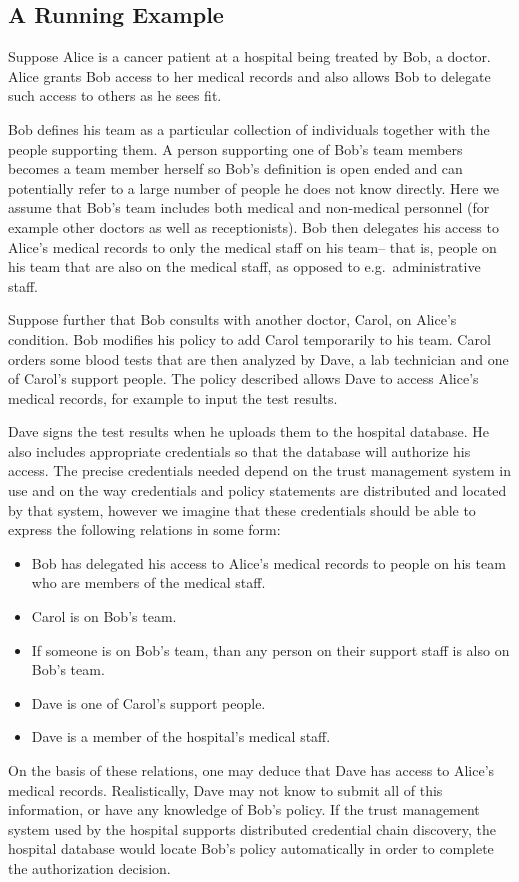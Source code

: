 \subsection{A Running Example}
\label{section-overview-example}

Suppose Alice is a cancer patient at a hospital being treated by Bob, a
doctor. Alice grants Bob access to her medical records and also allows Bob
to delegate such access to others as he sees fit.

Bob defines his team as a particular collection of individuals
together with the people supporting them. A person supporting one of
Bob's team members becomes a team member herself so Bob's definition
is open ended and can potentially refer to a large number of people he
does not know directly.  Here we assume that Bob's team includes both
medical and non-medical personnel (for example other doctors as well
as receptionists). Bob then delegates his access to Alice's medical
records to only the medical staff on his team-- that is, people on his
team that are also on the medical staff, as opposed to
e.g.~administrative staff.

Suppose further that Bob consults with another doctor, Carol, on Alice's
condition. Bob modifies his policy to add Carol temporarily to his team.
Carol orders some blood tests that are then analyzed by Dave, a lab
technician and one of Carol's support people. The policy described allows
Dave to access Alice's medical records, for example to input the test
results.

Dave signs the test results when he uploads them to the hospital database. He
also includes appropriate credentials so that the database will authorize his
access. The precise credentials needed depend on the trust management system
in use and on the way credentials and policy statements are distributed and
located by that system, however we imagine that these credentials should 
be able to express the following relations in some form:
\begin{itemize}
\item Bob has delegated his access to Alice's medical records to
people on his team who are members of the medical staff.

\item Carol is on Bob's team.

\item If someone is on Bob's team, than any person on their support
staff is also on Bob's team. 

\item Dave is one of Carol's support people.

\item Dave is a member of the hospital's medical staff.
\end{itemize}
On the basis of these relations, one may deduce that Dave has access to
Alice's medical records.  Realistically, Dave may not know to submit
all of this information, or have any knowledge of Bob's policy. If the
trust management system used by the hospital supports distributed
credential chain discovery, the hospital database would locate Bob's
policy automatically in order to complete the authorization decision.

